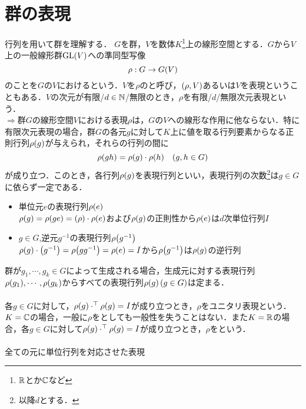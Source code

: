 \documentclass[main]{subfiles}
\begin{document}
\section{群の表現}
	行列を用いて群を理解する．
	$G$を群，$V$を数体$K$\footnote{$\mathbb{R}$とか$\mathbb{C}$など}上の線形空間とする．$G$から$V$上の一般線形群$\text{GL}\qty(V)$への準同型写像
	\[\rho:G\to G\qty(V)\]
	のことを$G$の$V$におけるという．$V$を$\rho$のと呼び，$\qty(\rho,V)$あるいは$V$を表現ということもある．$V$の次元が有限/$d\in\mathbb{N}$/無限のとき，$\rho$を有限/$d$/無限次元表現という．\\
	$\Rightarrow$群$G$の線形空間$V$における表現$\rho$は，$G$の$V$への線形な作用に他ならない．特に有限次元表現の場合，群$G$の各元$g$に対して$K$上に値を取る行列要素からなる正則行列$\rho\qty(g)$が与えられ，それらの行列の間に
	\[\rho\qty(gh)=\rho\qty(g)\cdot\rho\qty(h)\quad\qty(g,h\in G)\]
	が成り立つ．このとき，各行列$\rho\qty(g)$を表現行列といい，表現行列の次数\footnote{以降$d$とする．}は$g\in G$に依らず一定である．

	\begin{itemize}
		\item 単位元$e$の表現行列$\rho\qty(e)$\\$\rho\qty(g)=\rho\qty(ge)=\qty(\rho)\cdot\rho\qty(e)$および$\rho\qty(g)$の正則性から$\rho\qty(e)$は$d$次単位行列$I$
		\item $g\in G$,逆元$g^{-1}$の表現行列$\rho\qty(g^{-1})$\\$\rho\qty(g)\cdot\qty(g^{-1})=\rho\qty(gg^{-1})=\rho\qty(e)=I$から$\rho\qty(g^{-1})$は$\rho\qty(g)$の逆行列
	\end{itemize}
	群が$g_1,\cdots,g_k\in G$によって生成される場合，生成元に対する表現行列$\rho\qty(g_1),\cdots,\rho\qty(g_k)$からすべての表現行列$\rho\qty(g)\,\qty(g\in G)$は定まる．
	\paragraph{} 各$g\in G$に対して，$\rho\qty(g)\cdot^\top\rho\qty(g)=I$が成り立つとき，$\rho$をユニタリ表現という．$K=\mathbb{C}$の場合，一般に$\rho$をとしても一般性を失うことはない．また$K=\mathbb{R}$の場合，各$g\in G$に対して$\rho\qty(g)\cdot^\top\rho\qty(g)=I$が成り立つとき，$\rho$をという．
	\paragraph{} 全ての元に単位行列を対応させた表現
\end{document}
